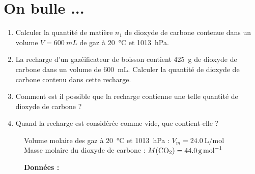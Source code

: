 \documentclass[a4paper,11pt,fleqn]{article}%
\begin{document}
\maketitle

\section{On bulle ...}
\begin{enumerate}
    \item Calculer la quantité de matière $n_1$ de dioxyde de carbone contenue dans un volume $V = \SI{600}{mL}$ de gaz à \SI{20}{\celsius} et \SI{1013}{hPa}.
    \vspace{8em}
    \item La recharge d’un gazéificateur de boisson contient \SI{425}{g} de dioxyde de carbone dans un volume de \SI{600}{mL}. Calculer la quantité  de dioxyde de carbone contenu dans cette recharge.
    \vspace{8em}
    \item Comment est il possible que la recharge contienne une telle quantité de dioxyde de carbone ?
    \vspace{8em}
    \item Quand la recharge est considérée comme vide, que contient-elle ?
    \vspace{8em}
\end{enumerate}

\begin{figure}[b]
    \begin{minipage}{\linewidth}
        \caption*{\textbf{Données :}}
        Volume molaire des gaz à \SI{20}{\celsius} et \SI{1013}{hPa} : $V_m = \SI{24,0}{\liter\per\mole}$\\
Masse molaire du dioxyde de carbone : $M(\ce{CO2}) = \SI{44,0}{\gram\per\mole}$
    \end{minipage}
\end{figure}

\newpage
\end{document}
